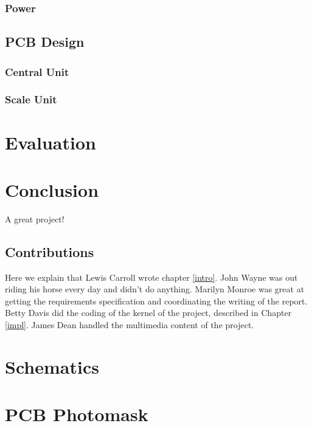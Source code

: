 \documentclass{l3proj}
\begin{document}
\subsection{Power}

\section{PCB Design}
\label{pcb}

\subsection{Central Unit}

\subsection{Scale Unit}

\chapter{Evaluation}

\chapter{Conclusion}

A great project!

\section{Contributions}

Here we explain that Lewis Carroll wrote chapter \ref{intro}. John Wayne
was out riding his horse every day and didn't do anything. Marilyn Monroe
was great at getting the requirements specification and coordinating the
writing of the report. Betty Davis did the coding of the kernel of the
project, described in Chapter \ref{impl}.  James Dean handled the
multimedia content of the project.



\newpage
\appendix
\chapter{Schematics}
\chapter{PCB Photomask}

\end{document}
